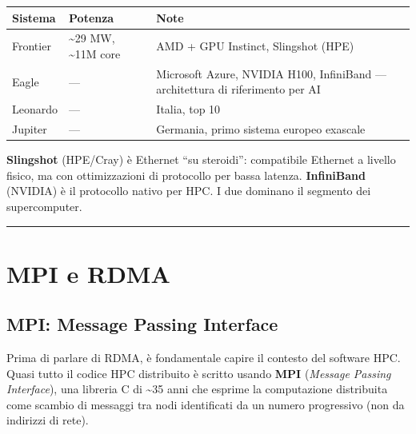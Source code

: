 \documentclass[
  italian,
  openany]{book}
\newcounter{none} %
\begin{document}
{\def\LTcaptype{none} %
\begin{longtable}[]{@{}
  >{\raggedright\arraybackslash}p{}
  >{\raggedright\arraybackslash}p{}
  >{\raggedright\arraybackslash}p{}@{}}
\toprule\noalign{}
\begin{minipage}[b]{\linewidth}\raggedright
Sistema
\end{minipage} & \begin{minipage}[b]{\linewidth}\raggedright
Potenza
\end{minipage} & \begin{minipage}[b]{\linewidth}\raggedright
Note
\end{minipage} \\
\midrule\noalign{}
\endhead
\bottomrule\noalign{}
\endlastfoot
Frontier & \textasciitilde29 MW, \textasciitilde11M core & AMD + GPU
Instinct, Slingshot (HPE) \\
Eagle & --- & Microsoft Azure, NVIDIA H100, InfiniBand --- architettura
di riferimento per AI \\
Leonardo & --- & Italia, top 10 \\
Jupiter & --- & Germania, primo sistema europeo exascale \\
\end{longtable}
}

\textbf{Slingshot} (HPE/Cray) è Ethernet ``su steroidi'': compatibile
Ethernet a livello fisico, ma con ottimizzazioni di protocollo per bassa
latenza. \textbf{InfiniBand} (NVIDIA) è il protocollo nativo per HPC. I
due dominano il segmento dei supercomputer.

\begin{center}\rule{0.5\linewidth}{0.5pt}\end{center}

\section{MPI e RDMA}\label{mpi-e-rdma}

\subsection{MPI: Message Passing
Interface}\label{mpi-message-passing-interface}

Prima di parlare di RDMA, è fondamentale capire il contesto del software
HPC. Quasi tutto il codice HPC distribuito è scritto usando \textbf{MPI}
(\emph{Message Passing Interface}), una libreria C di \textasciitilde35
anni che esprime la computazione distribuita come scambio di messaggi
tra nodi identificati da un numero progressivo (non da indirizzi di
rete).
\end{document}
